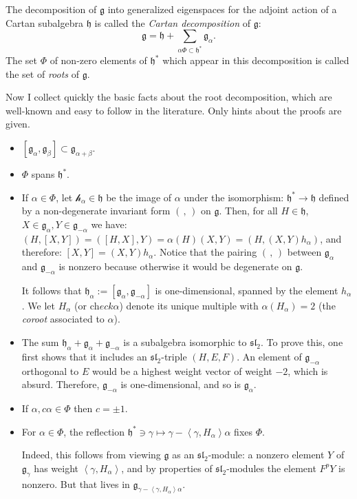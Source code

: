 The decomposition of $\mathfrak g$ into generalized eigenspaces for the adjoint action of a Cartan subalgebra $\mathfrak h$ is called the \emph{Cartan decomposition} of $\mathfrak g$:
$$\mathfrak g = \mathfrak h + \sum_{\alpha\Phi\subset\mathfrak h^*} \mathfrak g_\alpha.$$
The set $\Phi$ of non-zero elements of $\mathfrak h^*$ which appear in this decomposition is called the set of \emph{roots} of $\mathfrak g$.



Now I collect quickly the basic facts about the root decomposition, which are well-known and easy to follow in the literature. Only hints about the proofs are given.

\begin{itemize}
 \item $[\mathfrak g_\alpha,\mathfrak g_\beta]\subset\mathfrak g_{\alpha+\beta}$.
 \item $\Phi$ spans $\mathfrak h^*$.
 \item If $\alpha\in\Phi$, let $\mathcal h_\alpha \in \mathfrak h$ be the image of $\alpha$ under the isomorphism: $\mathfrak h^*\to\mathfrak h$ defined by a non-degenerate invariant form $(\,,\,)$ on $\mathfrak g$. Then, for all $H\in \mathfrak h$, $X\in \mathfrak g_\alpha, Y\in\mathfrak g_{-\alpha}$ we have: $(H,[X,Y]) = ([H,X],Y) = \alpha(H) (X,Y) = (H, (X,Y) h_\alpha)$, and therefore: $[X,Y] = (X,Y) h_\alpha$. Notice that the pairing $(\,,\,)$ between $\mathfrak g_\alpha$ and $\mathfrak g_{-\alpha}$ is nonzero because otherwise it would be degenerate on $\mathfrak g$. 

It follows that $\mathfrak h_\alpha:= [\mathfrak g_\alpha,\mathfrak g_{-\alpha}]$ is one-dimensional, spanned by the element $h_\alpha$. We let $H_\alpha$ (or $\text{ch}eck\alpha$) denote its unique multiple with $\alpha(H_\alpha)=2$ (the \emph{coroot} associated to $\alpha$).

 \item The sum $\mathfrak h_\alpha+ \mathfrak g_\alpha + \mathfrak g_{-\alpha}$ is a subalgebra isomorphic to $\mathfrak{sl}_2$. To prove this, one first shows that it includes an $\mathfrak{sl}_2$-triple $(H,E,F)$. An element of $\mathfrak g_{-\alpha}$ orthogonal to $E$ would be a highest weight vector of weight $-2$, which is absurd. Therefore, $\mathfrak g_{-\alpha}$ is one-dimensional, and so is $\mathfrak g_\alpha$.

 \item If $\alpha, c\alpha\in \Phi$ then $c = \pm 1$.

 \item For $\alpha\in \Phi$, the reflection $\mathfrak h^*\ni \gamma \mapsto \gamma - \left<\gamma,H_\alpha\right> \alpha$ fixes $\Phi$.

Indeed, this follows from viewing $\mathfrak g$ as an $\mathfrak{sl}_2$-module: a nonzero element $Y$ of $\mathfrak g_\gamma$ has weight $\left<\gamma,H_\alpha\right>$, and by properties of $\mathfrak{sl}_2$-modules the element $F^pY$ is nonzero. But that lives in $\mathfrak g_{\gamma - \left<\gamma,H_\alpha\right> \alpha}$.
\end{itemize}




